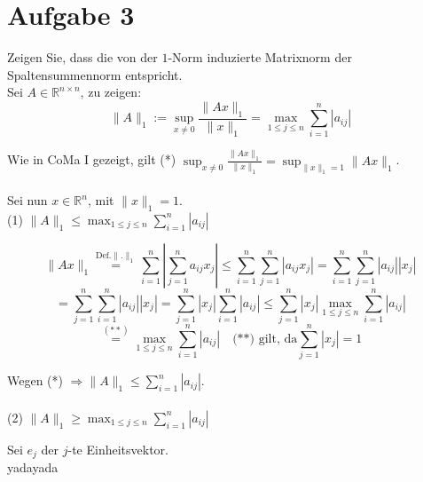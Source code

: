 \documentclass[11pt,a4paper,ngerman]{article}
\begin{document}


\section*{Aufgabe 3}
Zeigen Sie, dass die von der $1$-Norm induzierte Matrixnorm der Spaltensummennorm entspricht. \\

Sei $A \in \mathbb{R}^{n \times n}$, zu zeigen:
$$ \|A \|_1 := \sup_{x \neq 0}{\frac{\|Ax\|_{1}}{\|x\|_{1}}}
                  =\max_{1 \leq j \leq n}{\sum_{i=1}^{n}{|a_{ij}|}} $$

Wie in CoMa I gezeigt, gilt
(*) $\sup_{x \neq 0}{\frac{\|Ax\|_{1}}{\|x\|_{1}}} = \sup_{\|x\|_{1} = 1}{\|Ax\|_{1}}$. \\ \\
Sei nun $x \in \mathbb{R}^{n}$, mit $\|x\|_{1} = 1$.\\

(1) $\|A \|_1 \leq \max_{1 \leq j \leq n}{\sum_{i=1}^{n}{|a_{ij}|}}$ 

$$
\|Ax\|_{1} \stackrel{\text{Def.}\|.\|_{1}}{=}
     \sum_{i=1}^{n}{\left| \sum_{j=1}^{n}{a_{ij}x_j} \right|}
\leq \sum_{i=1}^{n}{\sum_{j=1}^{n}{\left|a_{ij}x_j\right|} }
=    \sum_{i=1}^{n}{\sum_{j=1}^{n}{|a_{ij}||x_j|} }
$$
$$
=    \sum_{j=1}^{n}{\sum_{i=1}^{n}{|a_{ij}||x_j|} }
=    \sum_{j=1}^{n}{|x_j| \sum_{i=1}^{n}{|a_{ij}|} }
\leq \sum_{j=1}^{n}{|x_j| \max_{1\leq j \leq n}{\sum_{i=1}^{n}{|a_{ij}|}} }
$$
$$
\stackrel{(**)}{=} \max_{1\leq j \leq n}{\sum_{i=1}^{n}{|a_{ij}|}} \quad \text{(**) gilt, da} \sum_{j=1}^{n}{|x_j|} = 1
$$

Wegen (*) $\Rightarrow \|A\|_{1} \leq \sum_{i=1}^{n}{|a_{ij}|}$. \\ \\

(2) $\|A \|_1 \geq \max_{1 \leq j \leq n}{\sum_{i=1}^{n}{|a_{ij}|}}$ 


Sei $e_j$ der $j$-te Einheitsvektor.\\
 yadayada

\label{LastPage}
\end{document}
